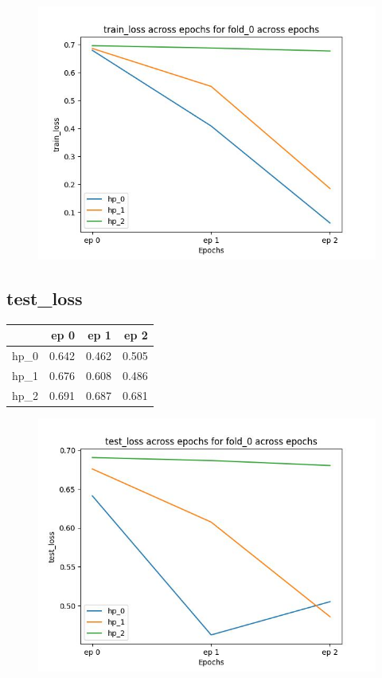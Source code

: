 \documentclass{article}
\begin{document}
\begin{figure}[H]
\includegraphics[scale = 0.75]{fold_0/train_loss}
\end{figure}
\subsection{test\_loss}
\begin{tabular}{lrrr}
\toprule
{} &   ep 0 &   ep 1 &   ep 2 \\
\midrule
hp\_0 &  0.642 &  0.462 &  0.505 \\
hp\_1 &  0.676 &  0.608 &  0.486 \\
hp\_2 &  0.691 &  0.687 &  0.681 \\
\bottomrule
\end{tabular}

\begin{figure}[H]
\includegraphics[scale = 0.75]{fold_0/test_loss}
\end{figure}
\end{document}
